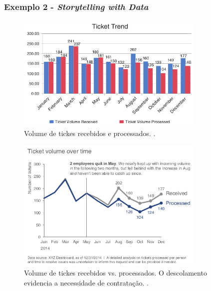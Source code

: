 \begin{frame}[allowframebreaks=1]
\frametitle{Exemplo 2 - \emph{Storytelling with Data}}
\begin{figure}[h]
 \centering
 \includegraphics[width=0.8\textwidth,height=0.6\textheight,keepaspectratio]{figures/storytelling_data_ex02a.png}
 \caption{Volume de tickes recebidos e processados. \cite{knaflic_storytelling_2015}.}
 \label{fig-storytelling_data_ex02a}
\end{figure}
\framebreak
\begin{figure}[h]
 \centering
 \includegraphics[width=0.8\textwidth,height=0.7\textheight,keepaspectratio]{figures/storytelling_data_ex02b.png}
 \caption{Volume de tickes recebidos vs. processados. O descolamento evidencia a necessidade de contratação. \cite{knaflic_storytelling_2015}.}
 \label{fig-storytelling_data_ex02b}
\end{figure}
\end{frame}

